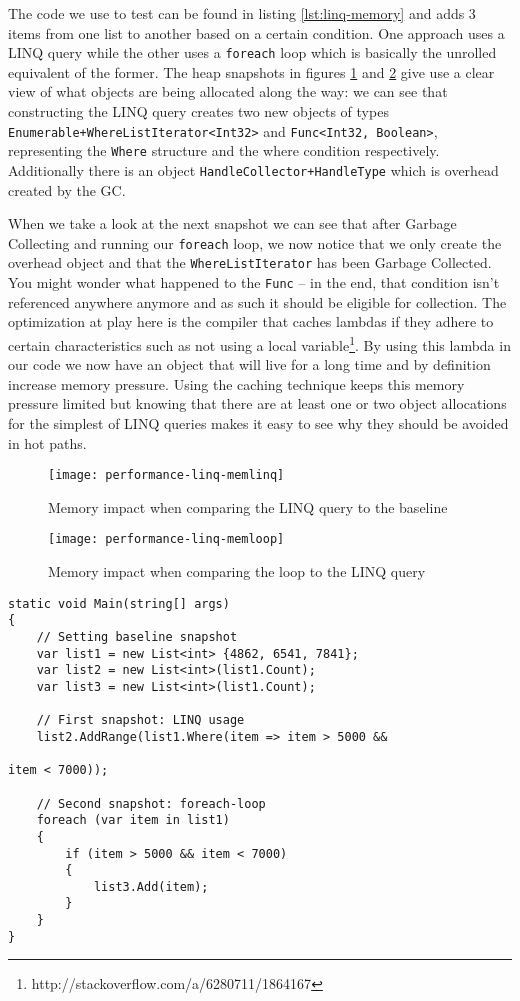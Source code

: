 The code we use to test can be found in listing \ref{lst:linq-memory} and adds 3 items from one list to another based on a certain condition. One approach uses a LINQ query while the other uses a \verb|foreach| loop which is basically the unrolled equivalent of the former. The heap snapshots in figures \ref{img:performance-linq-memlinq} and \ref{img:performance-linq-memloop} give use a clear view of what objects are being allocated along the way: we can see that constructing the LINQ query creates two new objects of types \verb|Enumerable+WhereListIterator<Int32>| and \verb|Func<Int32, Boolean>|, representing the \verb|Where| structure and the where condition respectively. Additionally there is an object \verb|HandleCollector+HandleType| which is overhead created by the GC. 

When we take a look at the next snapshot we can see that after Garbage Collecting and running our \verb|foreach| loop, we now notice that we only create the overhead object and that the \verb|WhereListIterator| has been Garbage Collected. You might wonder what happened to the \verb|Func| -- in the end, that condition isn't referenced anywhere anymore and as such it should be eligible for collection. The optimization at play here is the compiler that caches lambdas if they adhere to certain characteristics such as not using a local variable\footnote{http://stackoverflow.com/a/6280711/1864167}. By using this lambda in our code we now have an object that will live for a long time and by definition increase memory pressure. Using the caching technique keeps this memory pressure limited but knowing that there are at least one or two object allocations for the simplest of LINQ queries makes it easy to see why they should be avoided in hot paths.


\begin{figure}
\centering
\texttt{[image: performance-linq-memlinq]}
\caption{Memory impact when comparing the LINQ query to the baseline}
\label{img:performance-linq-memlinq}
\end{figure}

\begin{figure}[h]
\centering
\texttt{[image: performance-linq-memloop]}
\caption{Memory impact when comparing the loop to the LINQ query}
\label{img:performance-linq-memloop}
\end{figure}

\begin{lstlisting}[label={lst:linq-memory}]
static void Main(string[] args)
{
    // Setting baseline snapshot
    var list1 = new List<int> {4862, 6541, 7841};
    var list2 = new List<int>(list1.Count);
    var list3 = new List<int>(list1.Count);

    // First snapshot: LINQ usage
    list2.AddRange(list1.Where(item => item > 5000 && 
																			 item < 7000));

    // Second snapshot: foreach-loop
    foreach (var item in list1)
    {
        if (item > 5000 && item < 7000)
        {
            list3.Add(item);
        }
    }
}
\end{lstlisting}
